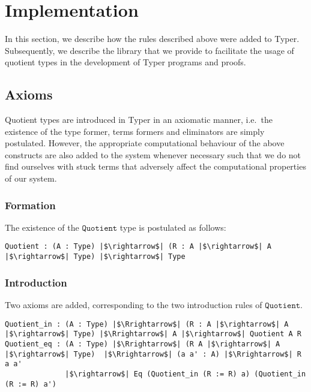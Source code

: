 \documentclass[12pt,twoside,maitrise]{dms}
\theoremstyle{definition}
\numberwithin{equation}{section}
\numberwithin{table}{chapter}
\numberwithin{figure}{chapter}
\newcommand\id[1] {\texttt{#1}}
\begin{document}
\section{Implementation}

In this section, we describe how the rules described above were added to Typer.
Subsequently, we describe the library that we provide to facilitate the usage of
quotient types in the development of Typer programs and proofs.

\subsection{Axioms}

Quotient types are introduced in Typer in an axiomatic manner, i.e.\ the existence
of the type former, terms formers and eliminators are simply postulated.
However, the appropriate computational behaviour of the above constructs are
also added to the system whenever necessary such that we do not find ourselves
with stuck terms that adversely affect the computational properties of our
system.

\subsubsection*{Formation}
The existence of the $\id{Quotient}$ type is postulated as follows:

\begin{verbatim}
Quotient : (A : Type) |$\rightarrow$| (R : A |$\rightarrow$| A |$\rightarrow$| Type) |$\rightarrow$| Type
\end{verbatim}

\subsubsection*{Introduction}
Two axioms are added, corresponding to the two introduction rules of $\id{Quotient}$.

\begin{verbatim}
Quotient_in : (A : Type) |$\Rrightarrow$| (R : A |$\rightarrow$| A |$\rightarrow$| Type) |$\Rrightarrow$| A |$\rightarrow$| Quotient A R
Quotient_eq : (A : Type) |$\Rrightarrow$| (R A |$\rightarrow$| A |$\rightarrow$| Type)  |$\Rrightarrow$| (a a' : A) |$\Rrightarrow$| R a a'
              |$\rightarrow$| Eq (Quotient_in (R := R) a) (Quotient_in (R := R) a')
\end{verbatim}
\end{document}
